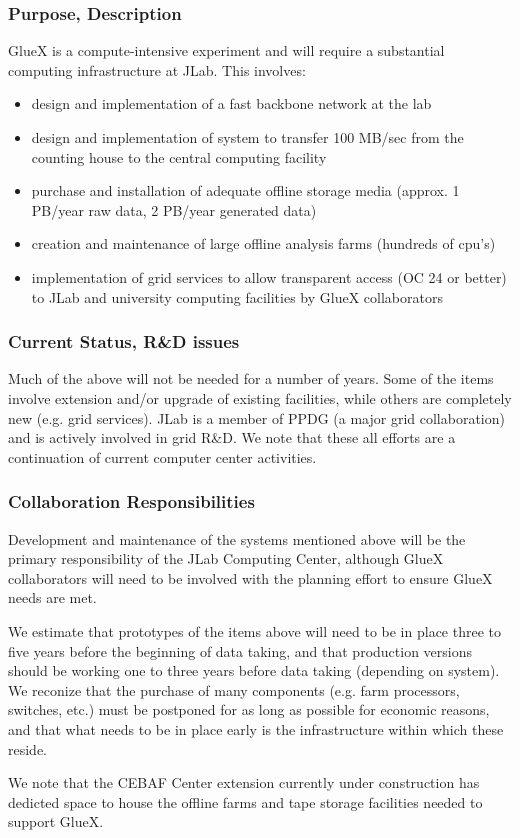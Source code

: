 \subsubsection*{Purpose, Description}

GlueX is a compute-intensive experiment and will require a substantial
computing infrastructure at JLab.  This involves:
\begin{itemize}
\item design and implementation of a fast backbone network at the lab
\item design and implementation of system to transfer 100 MB/sec from
  the counting house to the central computing facility
\item purchase and installation of adequate offline storage media
  (approx. 1 PB/year raw data, 2 PB/year generated data)
\item creation and maintenance of large offline analysis farms (hundreds of cpu's)
\item implementation of grid services to allow
transparent access (OC 24 or better) to JLab and university computing
facilities by GlueX collaborators
\end{itemize}



\subsubsection*{Current Status, R\&D issues}

Much of the above will not be needed for a number of years.  Some of
the items involve extension and/or upgrade of existing facilities,
while others are completely new (e.g. grid services).  JLab is a
member of PPDG (a major grid collaboration) and is actively involved
in grid R\&D.  We note that these all efforts are a continuation of
current computer center activities.



\subsubsection*{Collaboration Responsibilities}

Development and maintenance of the systems mentioned above will be the
primary responsibility of the JLab Computing Center, although GlueX
collaborators will need to be involved with the planning effort to
ensure GlueX needs are met.  

We estimate that prototypes of the items above will need to be in
place three to five years before the beginning of data taking, and
that production versions should be working one to three years before
data taking (depending on system).  We reconize that the purchase of
many components (e.g. farm processors, switches, etc.) must be
postponed for as long as possible for economic reasons, and that what
needs to be in place early is the infrastructure within which these
reside.

We note that the CEBAF Center extension currently under construction
has dedicted space to house the offline farms and tape storage
facilities needed to support GlueX.

